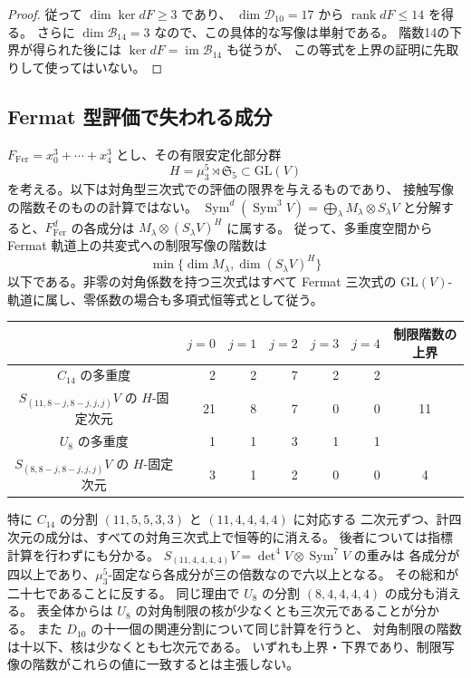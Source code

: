 \begin{proof}
従って $\dim\ker dF\ge3$ であり、
$\dim\mathcal D_{10}=17$ から $\operatorname{rank}dF\le14$ を得る。
さらに $\dim\mathcal B_{14}=3$ なので、この具体的な写像は単射である。
階数14の下界が得られた後には
$\ker dF=\operatorname{im}\mathcal B_{14}$ も従うが、
この等式を上界の証明に先取りして使ってはいない。
\end{proof}

\subsection{Fermat 型評価で失われる成分}\label{subsec:v11-fermat-scope}

\(F_{\mathrm{Fer}}=x_0^3+\cdots+x_4^3\) とし、その有限安定化部分群
\[
 H=\mu_3^5\rtimes\mathfrak S_5\subset\mathrm{GL}(V)
\]
を考える。以下は対角型三次式での評価の限界を与えるものであり、
接触写像の階数そのものの計算ではない。
\(
 \operatorname{Sym}^{d}(\operatorname{Sym}^{3}V)
 =\bigoplus_\lambda M_\lambda\otimes S_\lambda V
\)
と分解すると、\(F_{\mathrm{Fer}}^d\) の各成分は
\(M_\lambda\otimes(S_\lambda V)^H\) に属する。
従って、多重度空間から Fermat 軌道上の共変式への制限写像の階数は
\[
 \min\{\dim M_\lambda,\dim(S_\lambda V)^H\}
\]
以下である。非零の対角係数を持つ三次式はすべて Fermat 三次式の
\(\mathrm{GL}(V)\)-軌道に属し、零係数の場合も多項式恒等式として従う。

\begin{center}
\begin{tabular}{c|rrrrr|c}
 &\(j=0\)&\(j=1\)&\(j=2\)&\(j=3\)&\(j=4\)&制限階数の上界\\\hline
\(C_{14}\) の多重度&2&2&7&2&2&\\
\(S_{(11,8-j,8-j,j,j)}V\) の \(H\)-固定次元&21&8&7&0&0&11\\\hline
\(U_8\) の多重度&1&1&3&1&1&\\
\(S_{(8,8-j,8-j,j,j)}V\) の \(H\)-固定次元&3&1&2&0&0&4
\end{tabular}
\end{center}

特に \(C_{14}\) の分割 \((11,5,5,3,3)\) と \((11,4,4,4,4)\) に対応する
二次元ずつ、計四次元の成分は、すべての対角三次式上で恒等的に消える。
後者については指標計算を行わずにも分かる。
\(S_{(11,4,4,4,4)}V=\det^4V\otimes\operatorname{Sym}^7V\) の重みは
各成分が四以上であり、\(\mu_3^5\)-固定なら各成分が三の倍数なので六以上となる。
その総和が二十七であることに反する。
同じ理由で \(U_8\) の分割 \((8,4,4,4,4)\) の成分も消える。
表全体からは \(U_8\) の対角制限の核が少なくとも三次元であることが分かる。
また \(D_{10}\) の十一個の関連分割について同じ計算を行うと、
対角制限の階数は十以下、核は少なくとも七次元である。
いずれも上界・下界であり、制限写像の階数がこれらの値に一致するとは主張しない。

